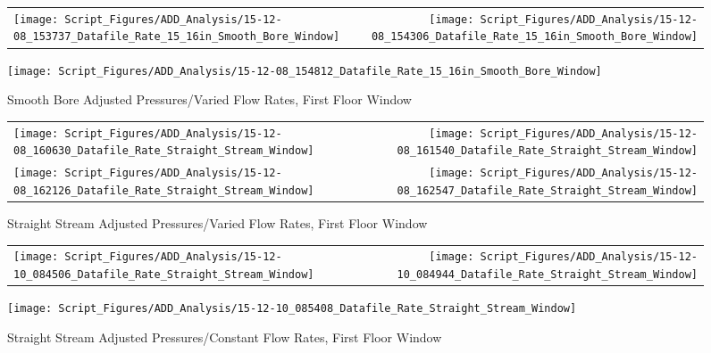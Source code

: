 \documentclass[12pt,oneside]{book}
\begin{document}
\clearpage

\begin{figure}[ht]
\begin{tabular*}{\textwidth}{lr}
\texttt{[image: Script\_Figures/ADD\_Analysis/15-12-08\_153737\_Datafile\_Rate\_15\_16in\_Smooth\_Bore\_Window]} &
\texttt{[image: Script\_Figures/ADD\_Analysis/15-12-08\_154306\_Datafile\_Rate\_15\_16in\_Smooth\_Bore\_Window]} \\
\end{tabular*}
\centering
\texttt{[image: Script\_Figures/ADD\_Analysis/15-12-08\_154812\_Datafile\_Rate\_15\_16in\_Smooth\_Bore\_Window]} \\
\caption{Smooth Bore Adjusted Pressures/Varied Flow Rates, First Floor Window}
\label{fig:Smooth Bore Adjusted Pressures/Varied Flow Rates, First Floor Window}
\end{figure}

\clearpage

\begin{figure}[ht]
\begin{tabular*}{\textwidth}{lr}
\texttt{[image: Script\_Figures/ADD\_Analysis/15-12-08\_160630\_Datafile\_Rate\_Straight\_Stream\_Window]} &
\texttt{[image: Script\_Figures/ADD\_Analysis/15-12-08\_161540\_Datafile\_Rate\_Straight\_Stream\_Window]} \\
\texttt{[image: Script\_Figures/ADD\_Analysis/15-12-08\_162126\_Datafile\_Rate\_Straight\_Stream\_Window]} &
\texttt{[image: Script\_Figures/ADD\_Analysis/15-12-08\_162547\_Datafile\_Rate\_Straight\_Stream\_Window]} \\
\end{tabular*}
\caption{Straight Stream Adjusted Pressures/Varied Flow Rates, First Floor Window}
\label{fig:Straight Stream Adjusted Pressures/Varied Flow Rates, First Floor Window}
\end{figure}

\clearpage

\begin{figure}[ht]
\begin{tabular*}{\textwidth}{lr}
\texttt{[image: Script\_Figures/ADD\_Analysis/15-12-10\_084506\_Datafile\_Rate\_Straight\_Stream\_Window]} &
\texttt{[image: Script\_Figures/ADD\_Analysis/15-12-10\_084944\_Datafile\_Rate\_Straight\_Stream\_Window]} \\
\end{tabular*}
\centering
\texttt{[image: Script\_Figures/ADD\_Analysis/15-12-10\_085408\_Datafile\_Rate\_Straight\_Stream\_Window]}
\caption{Straight Stream Adjusted Pressures/Constant Flow Rates, First Floor Window}
\label{fig:Straight Stream Adjusted Pressures/Constant Flow Rates, First Floor Window}
\end{figure}
\end{document}
